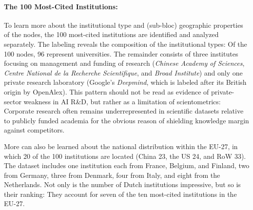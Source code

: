 \documentclass{article}
\begin{document}
	\paragraph{The 100 Most-Cited Institutions:} To learn more about the institutional type and (sub-bloc) geographic properties of the nodes, the 100 most-cited institutions are identified and analyzed separately. The labeling reveals the composition of the institutional types: Of the 100 nodes, 96 represent universities. The remainder consists of three institutes focusing on management and funding of research (\textit{Chinese Academy of Sciences}, \textit{Centre National de la Recherche Scientifique}, and \textit{Broad Institute}) and only one private research laboratory (Google's \textit{Deepmind}, which is labeled after its British origin by OpenAlex). This pattern should not be read as evidence of private-sector weakness in AI R\&D, but rather as a limitation of scientometrics: Corporate research often remains underrepresented in scientific datasets relative to publicly funded academia for the obvious reason of shielding knowledge margin against competitors.
	
	More can also be learned about the national distribution within the EU-27, in which 20 of the 100 institutions are located (China 23, the US 24, and RoW 33). The dataset includes one institution each from France, Belgium, and Finland, two from Germany, three from Denmark, four from Italy, and eight from the Netherlands. Not only is the number of Dutch institutions impressive, but so is their ranking: They account for seven of the ten most-cited institutions in the EU-27.
	
\end{document}
